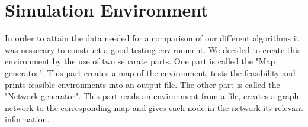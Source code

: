 \chapter{Simulation Environment}
In order to attain the data needed for a comparison of our different algorithms it was nessecary to construct a good testing environment. We decided to create this environment by the use of two separate parts. One part is called the "Map generator". This part creates a map of the environment, tests the feasibility and prints feasible environments into an output file. The other part is called the "Network generator". This part reads an environment from a file, creates a graph network to the corresponding map and gives each node in the network its relevant information.\\

